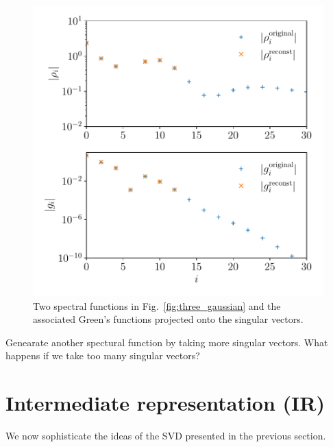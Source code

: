 \documentclass[submission, LectureNotes]{SciPost}
\begin{document}
\begin{figure}
    \centering
    \includegraphics[width=0.6\columnwidth]{gi_rhoi.pdf}
    \caption{
      Two spectral functions in Fig.~\ref{fig:three_gaussian}
      and the associated Green's functions projected onto the singular vectors.
      }
    \label{fig:gi_rhoi}
\end{figure}



\begin{Exercise}
    Genearate another spectural function by taking more singular vectors.
    What happens if we take too many singular vectors?
\end{Exercise}


\clearpage



\section{Intermediate representation (IR)}
We now sophisticate the ideas of the SVD presented in the previous section.
\end{document}
